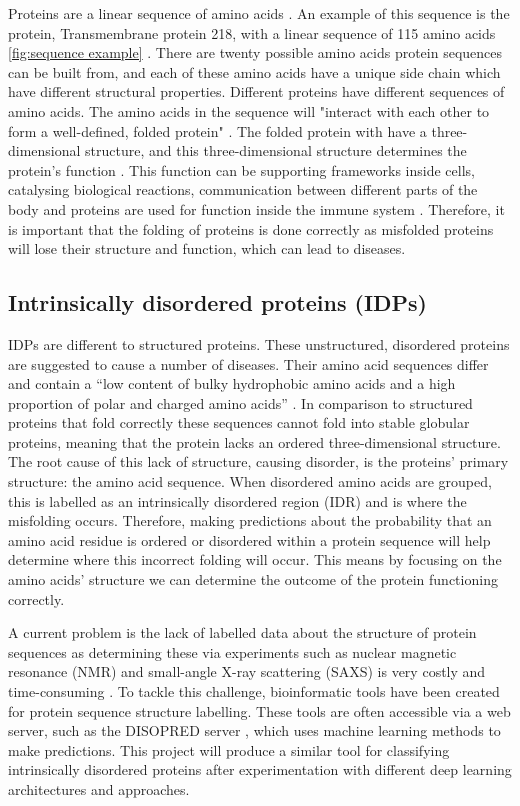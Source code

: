 \documentclass{l4proj}
\begin{document}
Proteins are a linear sequence of amino acids \citep{prot_struct_lib}. An example of this sequence is the protein, Transmembrane protein 218, with a linear sequence of 115 amino acids \ref{fig:sequence example} \citep{prot_A2RU14}. There are twenty possible amino acids \citep{aa_wiki} protein sequences can be built from, and each of these amino acids have a unique side chain which have different structural properties. Different proteins have different sequences of amino acids. The amino acids in the sequence will "interact with each other to form a well-defined, folded protein" \citep{protein_folding}. The folded protein with have a three-dimensional structure, and this three-dimensional structure determines the protein's function \citep{bbc_bitesize}. This function can be supporting frameworks inside cells, catalysing biological reactions, communication between different parts of the body and proteins are used for function inside the immune system \citep{bbc_bitesize}. Therefore, it is important that the folding of proteins is done correctly as misfolded proteins will lose their structure and function, which can lead to diseases. 

\subsection{Intrinsically disordered proteins (IDPs)}
\label{chap:background sec:IDPs}

IDPs are different to structured proteins. These unstructured, disordered proteins are suggested to cause a number of diseases. Their amino acid sequences differ and contain a “low content of bulky hydrophobic amino acids and a high proportion of polar and charged amino acids” \citep{idp_wiki}. In comparison to structured proteins that fold correctly these sequences cannot fold into stable globular proteins, meaning that the protein lacks an ordered three-dimensional structure. The root cause of this lack of structure, causing disorder, is the proteins’ primary structure: the amino acid sequence. When disordered amino acids are grouped, this is labelled as an intrinsically disordered region (IDR) and is where the misfolding occurs. Therefore, making predictions about the probability that an amino acid residue is ordered or disordered within a protein sequence will help determine where this incorrect folding will occur. This means by focusing on the amino acids’ structure we can determine the outcome of the protein functioning correctly. 

A current problem is the lack of labelled data about the structure of protein sequences as determining these via experiments such as nuclear magnetic resonance (NMR) and small-angle X-ray scattering (SAXS) is very costly and time-consuming \citep{disordered_prot_genus_camelus}. To tackle this challenge, bioinformatic tools have been created for protein sequence structure labelling. These tools are often accessible via a web server, such as the DISOPRED server \citep{disopred3_paper}, which uses machine learning methods to make predictions. This project will produce a similar tool for classifying intrinsically disordered proteins after experimentation with different deep learning architectures and approaches.
\end{document}
